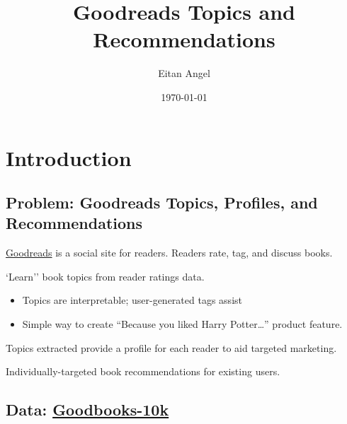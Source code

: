 \documentclass[handout]{beamer}
\title{Goodreads Topics and Recommendations}
\author{Eitan Angel}
\date{\today}
\begin{document}
    	

\frame{

\titlepage}



\frame{\tableofcontents[hideallsubsections]}

\usebackgroundtemplate{%
}
\section{Introduction}
\subsection{Problem: Goodreads Topics, Profiles, and Recommendations}\label{problem}

\begin{frame}
\href{https://www.goodreads.com}{Goodreads} is a social site for readers. Readers rate, tag, and discuss books.\vfill
\begin{description}[<+->]
\item[Topics:] `Learn'' book topics from reader ratings data. \vfill
\begin{itemize}[<+->]
\item Topics are interpretable; user-generated tags assist\vfill
\item Simple way to create ``Because you liked Harry Potter\ldots'' product feature.\vfill
\end{itemize}
\item[Profiles:] Topics extracted provide a profile for each reader to aid targeted marketing.\vfill
\item[Recommendations:] Individually-targeted book recommendations for existing users. \vfill
\end{description}
\end{frame}



\subsection{Data: \href{https://github.com/zygmuntz/goodbooks-10k}{Goodbooks-10k}}\label{data}
\end{document}
